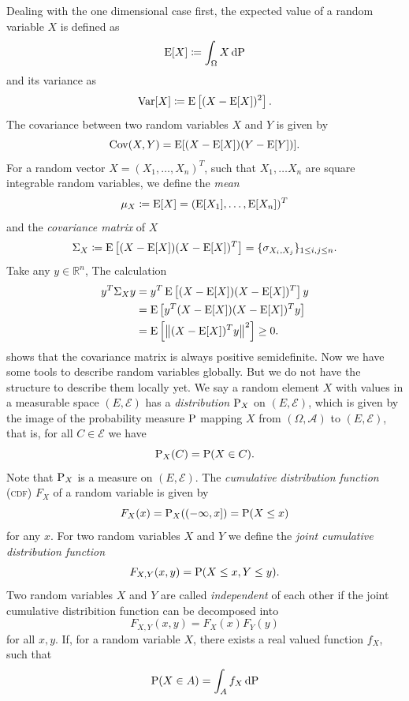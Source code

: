 Dealing with the one dimensional case first, the expected value of a random variable $X$ is defined as 
\[
    \E[X] \coloneqq \int_{\Omega} X \dx[\Prob]
\]
and its variance as
\[
    \Var[X] \coloneqq \E\left[(X-\E[X])^{2}\right].
\]
The covariance between two random variables $X$ and $Y$ is given by
\[
    \Cov(X,Y) = \E[ (X-\E[X]) (Y-\E[Y])].
\]
For a random vector \( X = (X_{1}, \dots, X_{n})^{T} \), such that \( X_{1}, \dots X_{n} \) are square integrable random variables, we define the \textit{mean}
\[
    \mu_{X} \coloneqq \E[X] = (\E[X_{1}], \dots, \E[X_{n}])^{T}
\]
and the \textit{covariance matrix} of $X$
\[
\Sigma_{X} \coloneqq \E\left[(X-\E[X])(X-\E[X])^{T}\right]
= \{\sigma_{X_{i}, X_{j}} \}_{1 \leq i,j \leq n}.
\]
Take any $y \in \mathbb{R}^{n}$, The calculation
\begin{align*}
    y^{T} \Sigma_{X} y &= y^{T} \E\left[(X-\E[X])(X-\E[X])^{T}\right] y \\
    &= \E\left[y^{T} (X-\E[X])(X-\E[X])^{T}y\right]\\
    &=\E\left[\left\lVert (X-\E[X])^{T} y \right\rVert^2\right] \geq 0.
\end{align*}
shows that the covariance matrix is always positive semidefinite.
Now we have some tools to describe random variables globally. But we do not have the structure to describe them locally yet.
We say a random element $X$  with values in a measurable space \( (E, \mathcal{E}) \) has a \textit{distribution} $\Prob_{X}$ on \( (E, \mathcal{E}) \), which is given by the image of the probability measure $\Prob$ mapping $X$ from \( (\Omega,\mathcal{A}) \) to \( (E, \mathcal{E}) \), that is, for all \( C \in \mathcal{E}\) we have 
\[
    \Prob_{X}(C) = \Prob(X \in C).
\]
Note that \( \Prob_{X} \) is a measure on \( (E, \mathcal{E}) \).
The \textit{cumulative distribution function} (\textsc{cdf}) \( F_{X} \) of a random variable is given by
\[
    F_{X}(x) = \Prob_{X}((-\infty,x]) = \Prob(X \leq x)
\]
for any $x$.
For two random variables $X$ and $Y$ we define the \textit{joint cumulative distribution function}
\[
    F_{X,Y}(x,y) = \Prob(X \leq x, Y \leq y).
\]
Two random variables $X$ and $Y$ are called \textit{independent} of each other if the joint cumulative distribition function can be decomposed into
\[
    F_{X,Y}(x,y) = F_{X}(x) F_{Y}(y)
\]
for all \( x,y \).
If, for a random variable $X$, there exists a real valued function $f_{X}$, such that 
\[
    \Prob( X \in A) = \int_{A} f_{X} \dx[\Prob]
\]
